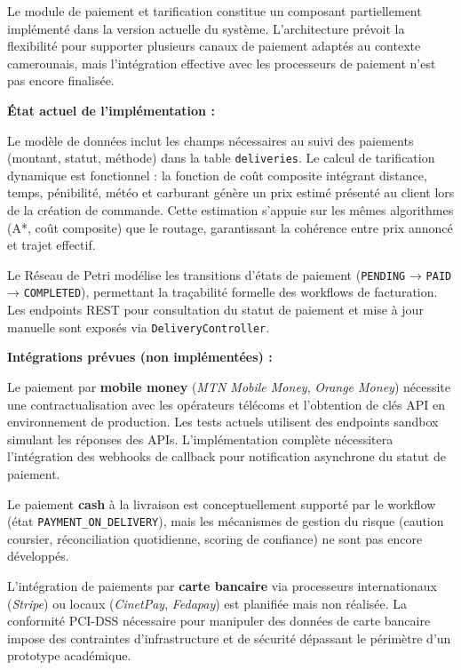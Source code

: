 Le module de paiement et tarification constitue un composant partiellement implémenté dans la version actuelle du système. L'architecture prévoit la flexibilité pour supporter plusieurs canaux de paiement adaptés au contexte camerounais, mais l'intégration effective avec les processeurs de paiement n'est pas encore finalisée.

\textbf{État actuel de l'implémentation :}

Le modèle de données inclut les champs nécessaires au suivi des paiements (montant, statut, méthode) dans la table \texttt{deliveries}. Le calcul de tarification dynamique est fonctionnel : la fonction de coût composite intégrant distance, temps, pénibilité, météo et carburant génère un prix estimé présenté au client lors de la création de commande. Cette estimation s'appuie sur les mêmes algorithmes (A*, coût composite) que le routage, garantissant la cohérence entre prix annoncé et trajet effectif.

Le Réseau de Petri modélise les transitions d'états de paiement (\texttt{PENDING} → \texttt{PAID} → \texttt{COMPLETED}), permettant la traçabilité formelle des workflows de facturation. Les endpoints REST pour consultation du statut de paiement et mise à jour manuelle sont exposés via \texttt{DeliveryController}.

\textbf{Intégrations prévues (non implémentées) :}

Le paiement par \textbf{mobile money} (\textit{MTN Mobile Money}, \textit{Orange Money}) nécessite une contractualisation avec les opérateurs télécoms et l'obtention de clés API en environnement de production. Les tests actuels utilisent des endpoints sandbox simulant les réponses des APIs. L'implémentation complète nécessitera l'intégration des webhooks de callback pour notification asynchrone du statut de paiement.

Le paiement \textbf{cash} à la livraison est conceptuellement supporté par le workflow (état \texttt{PAYMENT\_ON\_DELIVERY}), mais les mécanismes de gestion du risque (caution coursier, réconciliation quotidienne, scoring de confiance) ne sont pas encore développés.

L'intégration de paiements par \textbf{carte bancaire} via processeurs internationaux (\textit{Stripe}) ou locaux (\textit{CinetPay}, \textit{Fedapay}) est planifiée mais non réalisée. La conformité PCI-DSS nécessaire pour manipuler des données de carte bancaire impose des contraintes d'infrastructure et de sécurité dépassant le périmètre d'un prototype académique.

